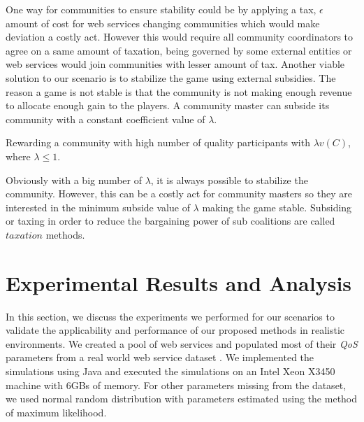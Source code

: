 \documentclass[10pt,journal,cspaper,compsoc]{IEEEtran}
\begin{document}
One way for communities to ensure  stability could be  by applying a tax, $\epsilon$ amount of cost for web services changing communities which would make deviation a costly act. However this would require all community coordinators to agree on a same amount of taxation, being governed by some external entities or web services would join communities with lesser amount of tax. Another viable solution to our scenario is to stabilize the game using external subsidies. The reason a game is not stable is that the community is not making enough revenue to allocate  enough gain to the players. A community master can subside its community with a constant coefficient value of $\lambda$. 

Rewarding a community with high number of quality participants with $\lambda v(C)$, where $\lambda \leq 1$. 

Obviously with a big number of $\lambda$, it is always possible to stabilize the community. However, this can be a costly act for community masters so they are interested in the minimum subside value of $\lambda$ making the game stable. Subsiding or taxing in order to reduce the bargaining power of sub coalitions are called $taxation$ \cite{eps346856} methods.






\section{Experimental Results and Analysis}\label{s:resutls}

In this section, we discuss the experiments we performed for our
scenarios to validate the applicability and performance of our
proposed methods in realistic environments. We created a pool of
web services and populated most of their \emph{QoS} parameters
from a real world web service dataset
\cite{DBLP:conf/smc/Al-MasriM09a}. We implemented the simulations
using Java and executed the simulations on an Intel Xeon X3450
machine with 6GBs of memory. For other parameters missing from the
dataset, we used normal random distribution with parameters
estimated using the method of maximum likelihood.
\end{document}
